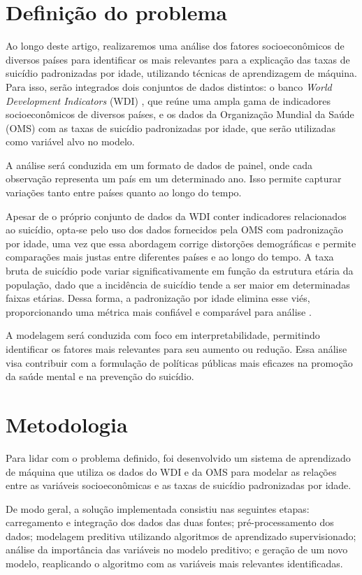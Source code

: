 \documentclass[letterpaper]{article}
\begin{document}
\section{Definição do problema} %
Ao longo deste artigo, realizaremos uma análise dos fatores socioeconômicos de diversos países para identificar os mais relevantes para a explicação das taxas de suicídio padronizadas por idade, utilizando técnicas de aprendizagem de máquina. Para isso, serão integrados dois conjuntos de dados distintos: o banco \textit{World Development Indicators} (WDI) \cite{wdi2024}, que reúne uma ampla gama de indicadores socioeconômicos de diversos países, e os dados da Organização Mundial da Saúde (OMS) com as taxas de suicídio padronizadas por idade, que serão utilizadas como variável alvo no modelo.

A análise será conduzida em um formato de dados de painel, onde cada observação representa um país em um determinado ano. Isso permite capturar variações tanto entre países quanto ao longo do tempo.

Apesar de o próprio conjunto de dados da WDI conter indicadores relacionados ao suicídio, opta-se pelo uso dos dados fornecidos pela OMS com padronização por idade, uma vez que essa abordagem corrige distorções demográficas e permite comparações mais justas entre diferentes países e ao longo do tempo. A taxa bruta de suicídio pode variar significativamente em função da estrutura etária da população, dado que a incidência de suicídio tende a ser maior em determinadas faixas etárias. Dessa forma, a padronização por idade elimina esse viés, proporcionando uma métrica mais confiável e comparável para análise \cite{whoageadjusted}.

A modelagem será conduzida com foco em interpretabilidade, permitindo identificar os fatores mais relevantes para seu aumento ou redução. Essa análise visa contribuir com a formulação de políticas públicas mais eficazes na promoção da saúde mental e na prevenção do suicídio.

\section{Metodologia} %
Para lidar com o problema definido, foi desenvolvido um sistema de aprendizado de máquina que utiliza os dados do WDI e da OMS para modelar as relações entre as variáveis socioeconômicas e as taxas de suicídio padronizadas por idade.

De modo geral, a solução implementada consistiu nas seguintes etapas: carregamento e integração dos dados das duas fontes; pré-processamento dos dados; modelagem preditiva utilizando algoritmos de aprendizado supervisionado; análise da importância das variáveis no modelo preditivo; e geração de um novo modelo, reaplicando o algoritmo com as variáveis mais relevantes identificadas.
\end{document}
